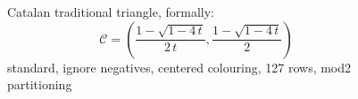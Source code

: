 
\begin{figure}[p]

    \noindent{}

    \captionsetup{singlelinecheck=off}
    \caption[$\mathcal{C}_{\equiv_{2}}$]{
        Catalan traditional triangle, formally: 
        \begin{displaymath}
            \mathcal{C}=\left(\frac{1-\sqrt{1-4 \, t}}{2 \, t}, \frac{1-\sqrt{1-4 \, t}}{2}\right)
        \end{displaymath} %
        standard, ignore negatives, centered colouring, 127 rows, mod2 partitioning
        }

    \label{fig:catalan-traditional-standard-ignore-negatives-centered-colouring-127-rows-mod2-partitioning-triangle}

\end{figure}
